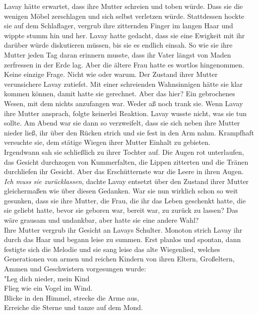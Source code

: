 Lavay hätte erwartet, dass ihre Mutter schreien und toben würde. Dass sie die wenigen Möbel 
zerschlagen und sich selbst verletzen würde. Stattdessen hockte sie auf dem Schlaflager, vergrub 
ihre zitternden Finger im langen Haar und wippte stumm hin und her. Lavay hatte gedacht, dass sie 
eine Ewigkeit mit ihr darüber würde diskutieren müssen, bis sie es endlich einsah. So wie sie 
ihre Mutter jeden Tag daran erinnern musste, dass ihr Vater längst von Maden zerfressen in der Erde 
lag. Aber die ältere Frau hatte es wortlos hingenommen. Keine einzige Frage. Nicht wie oder warum. 
Der Zustand ihrer Mutter verunsichere Lavay zutiefst. Mit einer schreienden Wahnsinnigen hätte sie 
klar kommen können, damit hatte sie gerechnet. Aber das hier? Ein gebrochenes Wesen, mit dem nichts 
anzufangen war. Weder aß noch trank sie. Wenn Lavay ihre Mutter ansprach, folgte keinerlei 
Reaktion. Lavay wusste nicht, was sie tun sollte. Am Abend war sie dann so verzweifelt, dass sie 
sich neben ihre Mutter nieder ließ, ihr über den Rücken strich und sie fest in den Arm nahm. 
Krampfhaft versuchte sie, dem stätige Wiegen ihrer Mutter Einhalt zu gebieten. \\
Irgendwann sah sie schließlich zu ihrer Tochter auf. Die Augen rot unterlaufen, das Gesicht 
durchzogen von Kummerfalten, die Lippen zitterten und die Tränen durchliefen ihr Gesicht. Aber das 
Erschütternste war die Leere in ihren Augen. \\
\textit{Ich muss sie zurücklassen}, dachte Lavay entsetzt über den Zustand ihrer Mutter 
gleichermaßen wie über diesen Gedanken. War sie nun wirklich schon so weit gesunken, dass sie ihre 
Mutter, die Frau, die ihr das Leben geschenkt hatte, die sie geliebt hatte, bevor sie 
geboren war, bereit war, zu zurück zu lassen? Das wäre grausam und undankbar, aber hatte sie eine 
andere Wahl? \\
Ihre Mutter vergrub ihr Gesicht an Lavays Schulter. Monoton strich Lavay ihr durch 
das Haar und begann leise zu summen. Erst planlos und spontan, dann festigte sich die Melodie und 
sie sang leise das alte Wiegenlied, welches Generationen von armen und reichen Kindern von ihren 
Eltern, Großeltern, Ammen und Geschwistern vorgesungen wurde:\\
"Leg dich nieder, mein Kind\\
Flieg wie ein Vogel im Wind.\\
Blicke in den Himmel, strecke die Arme aus,\\
Erreiche die Sterne und tanze auf dem Mond.\\
